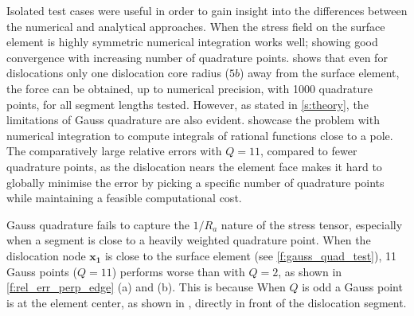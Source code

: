 \documentclass[11pt]{iopart}
\begin{document}
Isolated test cases were useful in order to gain insight into the differences between the numerical and analytical approaches. When the stress field on the surface element is highly symmetric numerical integration works well; showing good convergence with increasing number of quadrature points.  shows that even for dislocations only one dislocation core radius ($5b$) away from the surface element, the force can be obtained, up to numerical precision, with 1000 quadrature points, for all segment lengths tested. However, as stated in \cref{s:theory}, the limitations of Gauss quadrature are also evident.  showcase the problem with numerical integration to compute integrals of rational functions close to a pole. The comparatively large relative errors with $Q = 11$, compared to fewer quadrature points, as the dislocation nears the element face makes it hard to globally minimise the error by picking a specific number of quadrature points while maintaining a feasible computational cost.

Gauss quadrature fails to capture the $1/R_a$ nature of the stress tensor, especially when a segment is close to a heavily weighted quadrature point. When the dislocation node $\mathbf{x_{1}}$ is close to the surface element (see \cref{f:gauss_quad_test}), 11 Gauss points ($Q=11$) performs worse than with $Q=2$, as shown in \cref{f:rel_err_perp_edge} (a) and (b). This is because When $Q$ is odd a Gauss point is at the element center, as shown in , directly in front of the dislocation segment.
\end{document}
